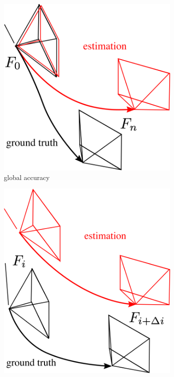 \begin{figure}
  \hspace*{1cm}
  \begin{subfigure}[b]{0.3\textwidth}
    \captionsetup{skip=6pt}
    \includegraphics[width=\textwidth]{images/ape_frames_2.png}
    \caption{global accuracy}
    \label{fig:3}
  \end{subfigure}
  \hfill
  \begin{subfigure}[b]{0.28\textwidth}
    \captionsetup{skip=6pt}
    \includegraphics[width=\textwidth]{images/rpe_frames_2.png}

\end{subfigure}
\end{figure}
